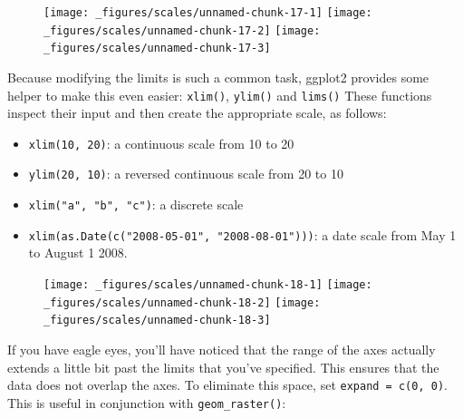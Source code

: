 \begin{figure}[H]
  \texttt{[image: \_figures/scales/unnamed-chunk-17-1]}%
  \texttt{[image: \_figures/scales/unnamed-chunk-17-2]}%
  \texttt{[image: \_figures/scales/unnamed-chunk-17-3]}
\end{figure}

Because modifying the limits is such a common task, ggplot2 provides
some helper to make this even easier: \texttt{xlim()}, \texttt{ylim()}
and \texttt{lims()} These functions inspect their input and then create
the appropriate scale, as follows:  

\begin{itemize}
\itemsep1pt\parskip0pt
\item
  \texttt{xlim(10, 20)}: a continuous scale from 10 to 20
\item
  \texttt{ylim(20, 10)}: a reversed continuous scale from 20 to 10
\item
  \texttt{xlim("a", "b", "c")}: a discrete scale
\item
  \texttt{xlim(as.Date(c("2008-05-01", "2008-08-01")))}: a date scale
  from May 1 to August 1 2008.
\end{itemize}

\begin{Shaded}
\begin{Highlighting}[]
\StringTok{ }\NormalTok{(}\NormalTok{, }\NormalTok{)}
\StringTok{ }\NormalTok{(}\NormalTok{, }\NormalTok{)}
\StringTok{ }\NormalTok{(} \NormalTok{(}\NormalTok{, }\NormalTok{))}
\end{Highlighting}
\end{Shaded}

\begin{figure}[H]
  \texttt{[image: \_figures/scales/unnamed-chunk-18-1]}%
  \texttt{[image: \_figures/scales/unnamed-chunk-18-2]}%
  \texttt{[image: \_figures/scales/unnamed-chunk-18-3]}
\end{figure}

If you have eagle eyes, you'll have noticed that the range of the axes
actually extends a little bit past the limits that you've specified.
This ensures that the data does not overlap the axes. To eliminate this
space, set \texttt{expand = c(0, 0)}. This is useful in conjunction with
\texttt{geom\_raster()}: 

